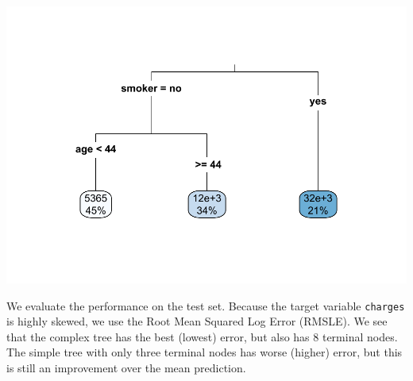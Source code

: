 \documentclass[
  openany]{book}
\newenvironment{Shaded}{\begin{snugshade}}{\end{snugshade}}
\newcommand{\DataTypeTok}[1]{\textcolor[rgb]{0.13,0.29,0.53}{#1}}
\newcommand{\DecValTok}[1]{\textcolor[rgb]{0.00,0.00,0.81}{#1}}
\newcommand{\FloatTok}[1]{\textcolor[rgb]{0.00,0.00,0.81}{#1}}
\newcommand{\KeywordTok}[1]{\textcolor[rgb]{0.13,0.29,0.53}{\textbf{#1}}}
\newcommand{\NormalTok}[1]{#1}
\newcommand{\OperatorTok}[1]{\textcolor[rgb]{0.81,0.36,0.00}{\textbf{#1}}}
\newcommand{\StringTok}[1]{\textcolor[rgb]{0.31,0.60,0.02}{#1}}
\begin{document}
\begin{Shaded}
\end{Shaded}

\includegraphics{06-tree-based-models_files/figure-latex/unnamed-chunk-9-1.pdf}

We evaluate the performance on the test set. Because the target variable \texttt{charges} is highly skewed, we use the Root Mean Squared Log Error (RMSLE). We see that the complex tree has the best (lowest) error, but also has 8 terminal nodes. The simple tree with only three terminal nodes has worse (higher) error, but this is still an improvement over the mean prediction.
\end{document}
